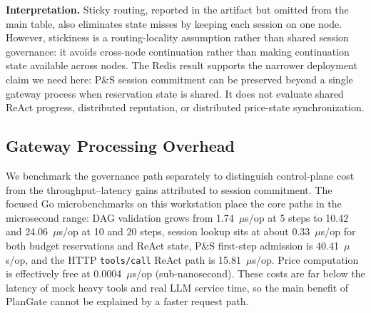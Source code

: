 \documentclass[sigconf,review,anonymous]{acmart}
\begin{document}
\textbf{Interpretation.}
Sticky routing, reported in the artifact but omitted from the main table, also eliminates state misses by keeping each session on one node.
However, stickiness is a routing-locality assumption rather than shared session governance: it avoids cross-node continuation rather than making continuation state available across nodes.
The Redis result supports the narrower deployment claim we need here: P\&S session commitment can be preserved beyond a single gateway process when reservation state is shared.
It does not evaluate shared ReAct progress, distributed reputation, or distributed price-state synchronization.

\subsection{Gateway Processing Overhead}
\label{sec:gateway_overhead}

We benchmark the governance path separately to distinguish control-plane cost from the throughput--latency gains attributed to session commitment. The focused Go microbenchmarks on this workstation place the core paths in the microsecond range: DAG validation grows from 1.74~$\mu$s/op at 5 steps to 10.42 and 24.06~$\mu$s/op at 10 and 20 steps, session lookup sits at about 0.33~$\mu$s/op for both budget reservations and ReAct state, P\&S first-step admission is 40.41~$\mu$s/op, and the HTTP \texttt{tools/call} ReAct path is 15.81~$\mu$s/op. Price computation is effectively free at 0.0004~$\mu$s/op (sub-nanosecond). These costs are far below the latency of mock heavy tools and real LLM service time, so the main benefit of PlanGate cannot be explained by a faster request path.

\begin{table}[t]
\centering
\caption{Gateway processing overhead on this workstation (focused Go microbenchmarks; mean per operation). The purpose is to bound governance cost, not to claim the request path is faster than a no-governance baseline.}
\label{tab:gateway_overhead}
\small
{}
\end{table}
\end{document}
